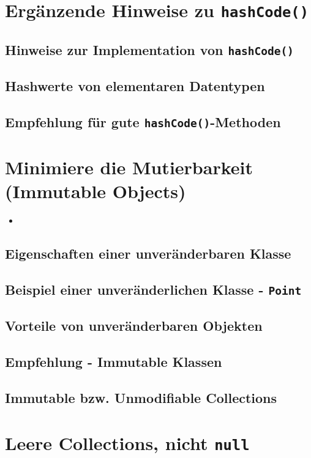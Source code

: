 \section{Ergänzende Hinweise zu \texttt{hashCode()}}
\subsection{Hinweise zur Implementation von \texttt{hashCode()}}
\subsection{Hashwerte von elementaren Datentypen}
\subsection{Empfehlung für gute \texttt{hashCode()}-Methoden}

\section{Minimiere die Mutierbarkeit (Immutable Objects)}
\begin{itemize}[noitemsep,topsep=0pt,leftmargin=*]
    \item
\end{itemize}
\subsection{Eigenschaften einer unveränderbaren Klasse}
\subsection{Beispiel einer unveränderlichen Klasse - \texttt{Point}}
\subsection{Vorteile von unveränderbaren Objekten}
\subsection{Empfehlung - Immutable Klassen }
\subsection{Immutable bzw. Unmodifiable Collections}

\section{Leere Collections, nicht \texttt{null}}
